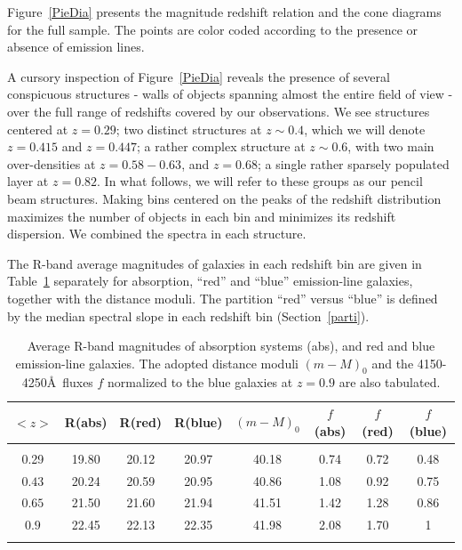 \documentclass[referee]{aa}
\begin{document}
Figure~\ref{PieDia} presents the magnitude redshift relation and the cone diagrams for the
full sample. The points are color coded according to the presence or absence of emission lines. 

A cursory inspection of Figure~\ref{PieDia} reveals the presence of several conspicuous structures -
walls of objects spanning almost the entire field of view - over the full range of redshifts covered
by our observations. We see structures centered at $z=0.29$; two distinct structures at $z\sim0.4$, which we will denote $z=0.415$ and $z=0.447$;
a rather complex structure at $z\sim0.6$, with two main over-densities at 
$z=0.58-0.63$, and $z=0.68$; a single rather sparsely populated layer at $z=0.82$. In what follows,
we will refer to these groups as our pencil beam structures. 
Making bins centered on the peaks of the redshift distribution maximizes the number of objects in each bin and minimizes its redshift 
dispersion. We combined the spectra in each structure.

The R-band average magnitudes of galaxies in each redshift bin are given in Table~\ref{magnitudes} separately for absorption, ``red'' and  ``blue'' emission-line galaxies,
together with the distance moduli. The partition ``red'' versus ``blue'' is defined by the median spectral slope in each redshift bin (Section~\ref{parti}).


\begin{table}
\renewcommand{\arraystretch}{0.9}
\centering 
\caption{Average R-band  magnitudes of absorption systems (abs), and  red and blue emission-line galaxies. The adopted distance moduli $(m-M)_0$ and the 4150-4250\AA\  fluxes $f$ normalized to the blue galaxies at $z = 0.9$  are also tabulated.}
\begin{tabular}{ c c c c c c c c}
$<z>$     & R(abs)  & R(red) & R(blue) & $(m-M)_0$  &     $f$(abs) & $f$(red)  & $f$(blue)  \\ \hline
& & & & & & & \\
0.29         & 19.80    & 20.12  & 20.97     & 40.18   &   0.74     & 0.72    & 0.48   \\ 
$0.43$    & 20.24    & 20.59  & 20.95     & 40.86   &   1.08     & 0.92    & 0.75    \\
$0.65$    & 21.50    & 21.60  & 21.94     & 41.51   &   1.42     & 1.28    & 0.86   \\
$0.9$      & 22.45    & 22.13  & 22.35     & 41.98    &   2.08    & 1.70    & 1  \\
\hline \hline
\label{magnitudes}
\end{tabular}
\end{table}
\end{document}
